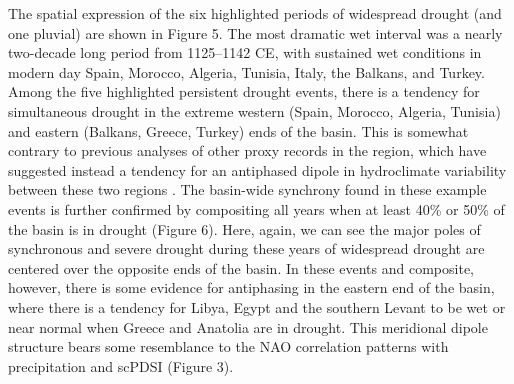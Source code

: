 \documentclass[draft,jgr]{AGUTeX}
\begin{document}
\begin{article}
\indent The spatial expression of the six highlighted periods of widespread drought (and one pluvial) are shown in Figure 5. The most dramatic wet interval was a nearly two-decade long period from 1125--1142 CE, with sustained wet conditions in modern day Spain, Morocco, Algeria, Tunisia, Italy, the Balkans, and Turkey. Among the five highlighted persistent drought events, there is a tendency for simultaneous drought in the extreme western (Spain, Morocco, Algeria, Tunisia) and eastern (Balkans, Greece, Turkey) ends of the basin. This is somewhat contrary to previous analyses of other proxy records in the region, which have suggested instead a tendency for an antiphased dipole in hydroclimate variability between these two regions \citep[e.g.,][]{Roberts:etal2012}. The basin-wide synchrony found in these example events is further confirmed by compositing all years when at least 40\% or 50\% of the basin is in drought (Figure 6). Here, again, we can see the major poles of synchronous and severe drought during these years of widespread drought are centered over the opposite ends of the basin. In these events and composite, however, there is some evidence for antiphasing in the eastern end of the basin, where there is a tendency for Libya, Egypt and the southern Levant to be wet or near normal when Greece and Anatolia are in drought. This meridional dipole structure bears some resemblance to the NAO correlation patterns with precipitation and scPDSI (Figure 3).


\end{article}
\end{document}
